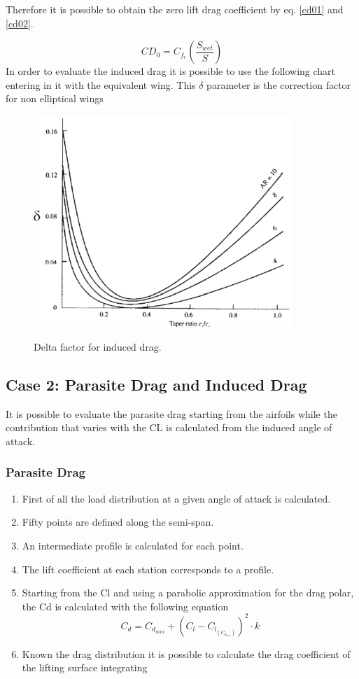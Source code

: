 Therefore it is possible to obtain the zero lift drag coefficient by eq. \ref{cd01} and \ref{cd02}.

\begin{equation}
CD_0 =  C_{f_{e}} \left( \frac{S_{wet}}{S}\right)
\end{equation}
 In order to evaluate the induced drag it is possible to use the following chart entering in it with the equivalent wing. This $\delta$ parameter is the correction factor for non elliptical wings
\begin{figure}[H]
	\centering
	{\includegraphics[height=8cm]{Immagini/deltainduceddrag}} 
	\caption{Delta factor for induced drag.}
	\label{deltadrag}
\end{figure}


\subsection{Case 2: Parasite Drag and Induced Drag}
It is possible to evaluate the parasite drag starting from the airfoils while the contribution that varies with the CL is calculated from the induced angle of attack.

\subsubsection{Parasite Drag}
\begin{enumerate}
	\item First of all the load distribution at a given angle of attack is calculated.
\item Fifty points are defined along the semi-span.
\item An intermediate profile is calculated for each point.
\item The lift coefficient at each station corresponds to a profile.
\item Starting from the Cl and using a parabolic approximation for the drag polar, the Cd is calculated with the following equation
	\begin{equation}
	C_d = C_{d_{min}} + (C_l - C_{l_{(C_{d_{min}})}})^2 \cdot k
	\end{equation}
	\item Known the drag distribution it is possible to calculate the drag coefficient of the lifting surface integrating
	\end{enumerate}
	
